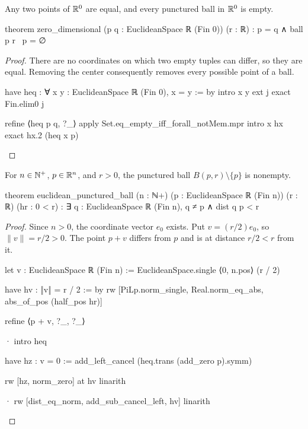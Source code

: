 \begin{lemma}
  \label{an1:lem:zero-dimensional}
  Any two points of $\mathbb{R}^{0}$ are equal, and every punctured ball in $\mathbb{R}^{0}$ is empty.

  \begin{lean}
    theorem zero_dimensional (p q : EuclideanSpace ℝ (Fin 0)) (r : ℝ) :
        p = q ∧ ball p r \ {p} = ∅
  \end{lean}
\end{lemma}

\begin{proof}
  There are no coordinates on which two empty tuples can differ, so they are equal.
  Removing the center consequently removes every possible point of a ball.

  \begin{lean}
    have heq : ∀ x y : EuclideanSpace ℝ (Fin 0), x = y := by
      intro x y
      ext j
      exact Fin.elim0 j

    refine ⟨heq p q, ?_⟩
    apply Set.eq_empty_iff_forall_notMem.mpr
    intro x hx
    exact hx.2 (heq x p)
  \end{lean}

\end{proof}

\begin{lemma}
  \label{an1:lem:deleted-neighborhood-in-Rn-is-non-empty}
  For $n\in\mathbb{N}^{+}$, $p\in\mathbb{R}^{n}$, and $r>0$, the punctured ball $B(p,r)\setminus\{p\}$ is
  nonempty.

  \begin{lean}
    theorem euclidean_punctured_ball (n : ℕ+)
        (p : EuclideanSpace ℝ (Fin n)) (r : ℝ) (hr : 0 < r) :
        ∃ q : EuclideanSpace ℝ (Fin n), q ≠ p ∧ dist q p < r
  \end{lean}
\end{lemma}

\begin{proof}
  Since $n>0$, the coordinate vector $e_0$ exists.
  Put $v=(r/2)e_0$, so $\|v\|=r/2>0$.
  The point $p+v$ differs from $p$ and is at distance $r/2<r$ from it.

  \begin{lean}
    let v : EuclideanSpace ℝ (Fin n) := EuclideanSpace.single ⟨0, n.pos⟩ (r / 2)

    have hv : ‖v‖ = r / 2 := by
      rw [PiLp.norm_single, Real.norm_eq_abs, abs_of_pos (half_pos hr)]

    refine ⟨p + v, ?_, ?_⟩

    · intro heq

      have hz : v = 0 := add_left_cancel (heq.trans (add_zero p).symm)

      rw [hz, norm_zero] at hv
      linarith

    · rw [dist_eq_norm, add_sub_cancel_left, hv]
      linarith
  \end{lean}

\end{proof}

